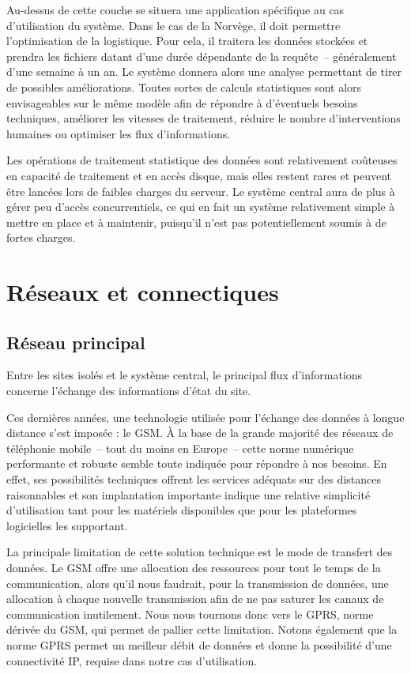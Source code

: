 \documentclass[a4paper, 11pt, final]{article}
\begin{document}
Au-dessus de cette couche se situera une application spécifique au cas
d'utilisation du système. Dans le cas de la Norvège, il doit permettre
l'optimisation de la logistique. Pour cela, il traitera les données stockées
et prendra les fichiers datant d'une durée dépendante de la requête~--
généralement d'une semaine à un an. Le système donnera alors une
analyse permettant de tirer de possibles améliorations. Toutes sortes
de calculs statistiques sont alors envisageables sur le même modèle
afin de répondre à d'éventuels besoins techniques, améliorer les
vitesses de traitement, réduire le nombre d'interventions humaines ou
optimiser les flux d'informations.

Les opérations de traitement statistique des données sont relativement
coûteuses en capacité de traitement et en accès disque, mais elles
restent rares et peuvent être lancées lors de faibles charges du
serveur. Le système central aura de plus à gérer peu d'accès
concurrentiels, ce qui en fait un système relativement simple à mettre
en place et à maintenir, puisqu'il n'est pas potentiellement soumis à
de fortes charges.


\section{Réseaux et connectiques}

\subsection{Réseau principal}
Entre les sites isolés et le système central, le principal flux
d'informations concerne l'échange des informations d'état du site.

Ces dernières années, une technologie utilisée pour l'échange des
données à longue distance s'est imposée : le GSM. À la base de la
grande majorité des réseaux de téléphonie mobile~-- tout du moins en
Europe~-- cette norme numérique performante et robuste semble toute
indiquée pour répondre à nos besoins. En effet, ses possibilités
techniques offrent les services adéquats sur des distances
raisonnables et son implantation importante indique une relative
simplicité d'utilisation tant pour les matériels disponibles que pour
les plateformes logicielles les supportant.

La principale limitation de cette solution technique est le mode de
transfert des données. Le GSM offre une allocation des ressources pour
tout le temps de la communication, alors qu'il nous faudrait, pour la
transmission de données, une allocation à chaque nouvelle transmission
afin de ne pas saturer les canaux de communication inutilement. Nous
nous tournons donc vers le GPRS, norme dérivée du GSM, qui permet de
pallier cette limitation. Notons également que la norme GPRS permet un
meilleur débit de données et donne la possibilité d'une connectivité
IP, requise dans notre cas d'utilisation.
\end{document}
